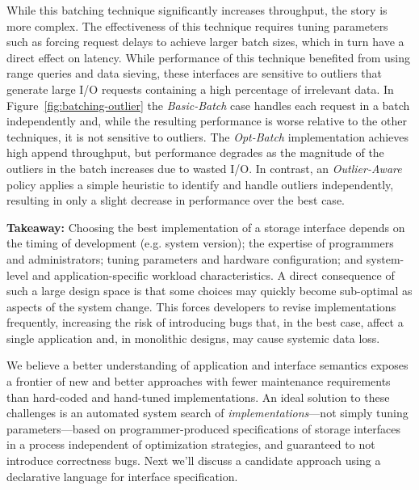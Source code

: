 While this batching technique significantly increases throughput, the story is
more complex. The effectiveness of this technique requires tuning parameters
such as forcing request delays to achieve larger batch sizes, which in turn
have a direct effect on latency. While performance of this technique benefited
from using range queries and data sieving, these interfaces are sensitive to
outliers that generate large I/O requests containing a high percentage of
irrelevant data.  In Figure~\ref{fig:batching-outlier} the \emph{Basic-Batch}
case handles each request in a batch independently and, while the resulting
performance is worse relative to the other techniques, it is not sensitive to
outliers. The \emph{Opt-Batch} implementation achieves high append throughput,
but performance degrades as the magnitude of the outliers in the batch
increases due to wasted I/O. In contrast, an \emph{Outlier-Aware} policy
applies a simple heuristic to identify and handle outliers independently,
resulting in only a slight decrease in performance over the best case.

\textbf{Takeaway:} Choosing the best implementation of a storage interface
depends on the timing of development (e.g. system version); the expertise of
programmers and administrators; tuning parameters and hardware configuration;
and system-level and application-specific workload characteristics. A
direct consequence of such a large design space is that some choices may
quickly become sub-optimal as aspects of the system change.  This forces
developers to revise implementations frequently, increasing the risk of introducing bugs that, in the
best case, affect a single application and, in monolithic designs, may
cause systemic data loss.

We believe a better understanding of application and interface semantics
exposes a frontier of new and better approaches with fewer maintenance
requirements than hard-coded and hand-tuned implementations. An ideal solution
to these challenges is an automated system search of
\emph{implementations}---not simply tuning parameters---based on
programmer-produced specifications of storage interfaces in a process
independent of optimization strategies, and guaranteed to not introduce
correctness bugs. Next we'll discuss a candidate approach using a declarative
language for interface specification.

